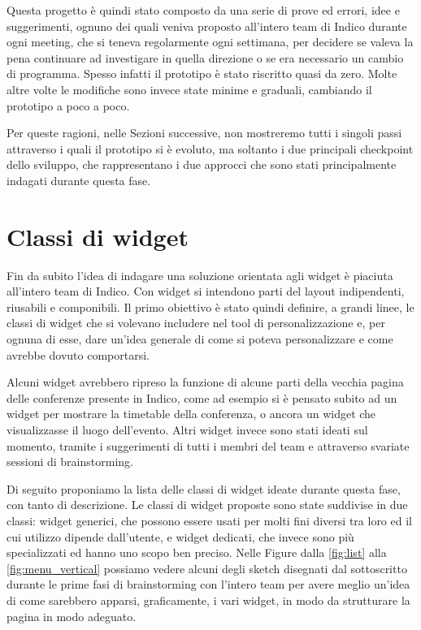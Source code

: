             Questa progetto è quindi stato composto da una serie di prove ed errori, idee e suggerimenti, ognuno dei quali veniva proposto all'intero team di Indico durante ogni meeting, che si teneva regolarmente ogni settimana, per decidere se valeva la pena continuare ad investigare in quella direzione o se era necessario un cambio di programma. Spesso infatti il prototipo è stato riscritto quasi da zero. Molte altre volte le modifiche sono invece state minime e graduali, cambiando il prototipo a poco a poco.
            
            Per queste ragioni, nelle Sezioni successive, non mostreremo tutti i singoli passi attraverso i quali il prototipo si è evoluto, ma soltanto i due principali checkpoint dello sviluppo, che rappresentano i due approcci che sono stati principalmente indagati durante questa fase.
            
    \section{Classi di widget} \label{sec:ccp;classi_widget}
    
        Fin da subito l'idea di indagare una soluzione orientata agli widget è piaciuta all'intero team di Indico. Con widget si intendono parti del layout indipendenti, riusabili e componibili. Il primo obiettivo è stato quindi definire, a grandi linee, le classi di widget che si volevano includere nel tool di personalizzazione e, per ognuna di esse, dare un'idea generale di come si poteva personalizzare e come avrebbe dovuto comportarsi.
        
        Alcuni widget avrebbero ripreso la funzione di alcune parti della vecchia pagina delle conferenze presente in Indico, come ad esempio si è pensato subito ad un widget per mostrare la timetable della conferenza, o ancora un widget che visualizzasse il luogo dell'evento. Altri widget invece sono stati ideati sul momento, tramite i suggerimenti di tutti i membri del team e attraverso svariate sessioni di brainstorming.
        
        Di seguito proponiamo la lista delle classi di widget ideate durante questa fase, con tanto di descrizione. Le classi di widget proposte sono state suddivise in due classi: widget generici, che possono essere usati per molti fini diversi tra loro ed il cui utilizzo dipende dall'utente, e widget dedicati, che invece sono più specializzati ed hanno uno scopo ben preciso. Nelle Figure dalla \ref{fig:list} alla \ref{fig:menu_vertical} possiamo vedere alcuni degli sketch disegnati dal sottoscritto durante le prime fasi di brainstorming con l'intero team per avere meglio un'idea di come sarebbero apparsi, graficamente, i vari widget, in modo da strutturare la pagina in modo adeguato.
        
